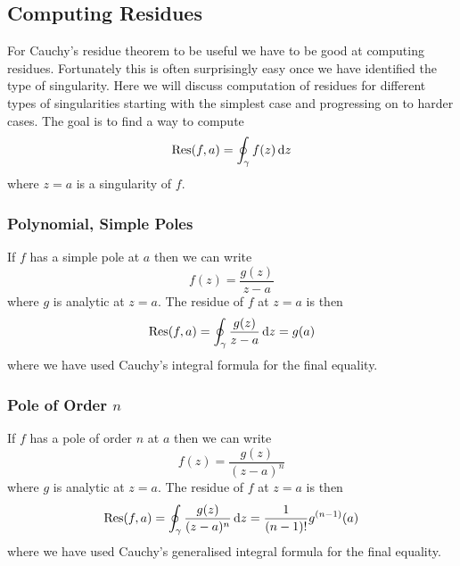 \documentclass{article}
\begin{document}
    \subsection{Computing Residues}
    For Cauchy's residue theorem to be useful we have to be good at computing residues.
    Fortunately this is often surprisingly easy once we have identified the type of singularity.
    Here we will discuss computation of residues for different types of singularities starting with the simplest case and progressing on to harder cases.
    The goal is to find a way to compute
    \[\Res(f, a) = \oint_{\gamma} f(z) \dd{z}\]
    where \(z = a\) is a singularity of \(f\).
    
    \subsubsection{Polynomial, Simple Poles}
    If \(f\) has a simple pole at \(a\) then we can write
    \[f(z) = \frac{g(z)}{z - a}\]
    where \(g\) is analytic at \(z = a\).
    The residue of \(f\) at \(z = a\) is then
    \[\Res(f, a) = \oint_{\gamma} \frac{g(z)}{z - a}\dd{z} = g(a)\]
    where we have used Cauchy's integral formula for the final equality.
    
    \subsubsection{Pole of Order \texorpdfstring{\(n\)}{n}}
    If \(f\) has a pole of order \(n\) at \(a\) then we can write
    \[f(z) = \frac{g(z)}{(z - a)^n}\]
    where \(g\) is analytic at \(z = a\).
    The residue of \(f\) at \(z = a\) is then
    \[\Res(f, a) = \oint_{\gamma} \frac{g(z)}{(z - a)^n} \dd{z} = \frac{1}{(n - 1)!}g^{(n-1)}(a)\]
    where we have used Cauchy's generalised integral formula for the final equality.
    
\end{document}
